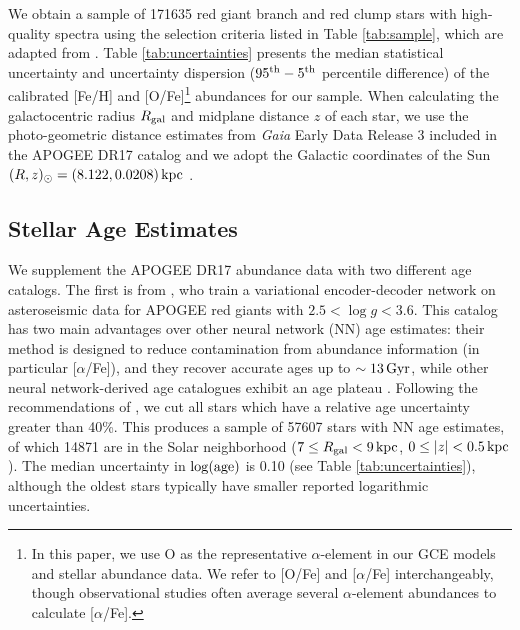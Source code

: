 \documentclass[twocolumn,twocolappendix,linenumbers]{aastex631}
\newcommand{\aFe}{[$\alpha$/Fe]\xspace}
\newcommand{\kpc}{\,{\rm kpc}}
\newcommand{\Gyr}{\,{\rm Gyr}}
\begin{document}
We obtain a sample of \num{171635} red giant branch and red clump stars with high-quality spectra using the selection criteria listed in Table \ref{tab:sample}, which are adapted from \citet{hayden_chemical_2015}. Table \ref{tab:uncertainties} presents the median statistical uncertainty and uncertainty dispersion ($95^{\rm th} - 5^{\rm th}$ percentile difference) of the calibrated [Fe/H] and [O/Fe]\footnote{
    In this paper, we use O as the representative $\alpha$-element in our GCE models and stellar abundance data. We refer to [O/Fe] and \aFe interchangeably, though observational studies often average several $\alpha$-element abundances to calculate \aFe.
} abundances for our sample. When calculating the galactocentric radius $R_{\rm gal}$ and midplane distance $z$ of each star, we use the \citet{bailer-jones_estimating_2021} photo-geometric distance estimates from {\it Gaia} Early Data Release 3 \citep{gaia_collaboration_gaia_2016,gaia_collaboration_gaia_2021} included in the APOGEE DR17 catalog and we adopt the Galactic coordinates of the Sun $(R,z)_\odot=(8.122, 0.0208)\kpc$ \citep{gravity_collaboration_detection_2018,bennett_vertical_2019}.

\subsection{Stellar Age Estimates}
\label{sec:age-estimates}

We supplement the APOGEE DR17 abundance data with two different age catalogs. The first is from \citet{leung_variational_2023}, who train a variational encoder-decoder network on asteroseismic data for APOGEE red giants with $2.5<\log g<3.6$. This catalog has two main advantages over other neural network (NN) age estimates: their method is designed to reduce contamination from abundance information (in particular [$\alpha$/Fe]), and they recover accurate ages up to $\sim13\Gyr$, while other neural network-derived age catalogues exhibit an age plateau \citep[e.g.,][]{mackereth_dynamical_2019}. Following the recommendations of \citet{leung_variational_2023}, we cut all stars which have a relative age uncertainty greater than 40\%. This produces a sample of \num{57607} stars with NN age estimates, of which \num{14871} are in the Solar neighborhood ($7\leq R_{\rm gal}<9\kpc$, $0\leq|z|<0.5\kpc$). The median uncertainty in $\log({\rm age})$ is 0.10 (see Table \ref{tab:uncertainties}), although the oldest stars typically have smaller reported logarithmic uncertainties.
\end{document}
